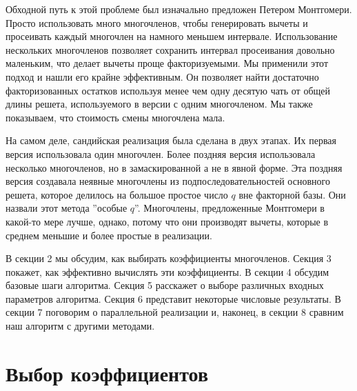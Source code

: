 \documentclass[a4paper,12pt]{report}
\begin{document}
Обходной путь к этой проблеме был изначально предложен Петером Монтгомери. Просто использовать много многочленов, чтобы генерировать вычеты и просеивать каждый многочлен на намного меньшем интервале. Использование нескольких многочленов позволяет сохранить интервал просеивания довольно маленьким, что делает вычеты проще факторизуемыми. Мы применили этот подход и нашли его крайне эффективным. Он позволяет найти достаточно факторизованных остатков используя менее чем одну десятую чать от общей длины решета, используемого в версии с одним многочленом. Мы также показываем, что стоимость смены многочлена мала.

На самом деле, сандийская реализация была сделана в двух этапах. Их первая версия использовала один многочлен. Более поздняя версия использовала несколько многочленов, но в замаскированной а не в явной форме. Эта поздняя версия создавала неявные многочлены из подпоследовательностей основного решета, которое делилось на большое простое число $q$ вне факторной базы. Они назвали этот метода ''особые $q$''. Многочлены, предложенные Монтгомери в какой-то мере лучше, однако, потому что они производят вычеты, которые в среднем меньшие и более простые в реализации.

В секции 2 мы обсудим, как выбирать коэффициенты многочленов. Секция 3 покажет, как эффективно вычислять эти коэффициенты. В секции 4 обсудим базовые шаги алгоритма. Секция 5 расскажет о выборе различных входных параметров алгоритма. Секция 6 представит некоторые числовые результаты. В секции 7 поговорим о параллельной реализации и, наконец, в секции 8 сравним наш алгоритм с другими методами.

\section{Выбор коэффициентов}
\end{document}
